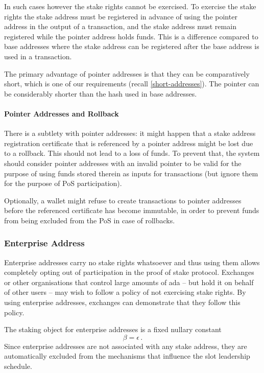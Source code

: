 \documentclass[11pt,a4paper]{article}
\begin{document}
In such cases however the stake rights cannot be exercised. To exercise
the stake rights the stake address must be registered in advance of using
the pointer address in the output of a transaction, and the stake address
must remain registered while the pointer address holds funds. This is a
difference compared to base addresses where the stake address can be
registered after the base address is used in a transaction.

The primary advantage of pointer addresses is that they can be
comparatively short, which is one of our requirements (recall
\cref{short-addresses}). The pointer can be considerably shorter than
the hash used in base addresses.

\paragraph{Pointer Addresses and Rollback}
There is a subtlety with pointer addresses: it might happen that a
stake address registration certificate that is referenced by a pointer
address might be lost due to a rollback. This should not lead to
a loss of funds. To prevent that, the system should
consider pointer addresses with an invalid pointer to be valid for the
purpose of using funds stored therein as inputs for transactions (but
ignore them for the purpose of PoS participation).

Optionally, a wallet might refuse to create transactions to pointer
addresses before the referenced certificate has become immutable, in
order to prevent funds from being excluded from the PoS in case of
rollbacks.

\subsubsection{Enterprise Address}
\label{enterprise-address}

Enterprise addresses carry no stake rights whatsoever and thus using
them allows completely opting out of participation in the proof of stake
protocol. Exchanges or other organisations that control large amounts of
ada -- but hold it on behalf of other users -- may wish to follow a
policy of not exercising stake rights. By using enterprise addresses,
exchanges can demonstrate that they follow this policy.

The staking object for enterprise addresses is a fixed nullary constant
\[
\beta = \epsilon\,.
\]
Since enterprise addresses are not associated with any stake address, they
are automatically excluded from the mechanisms that influence the slot
leadership schedule.
\end{document}
